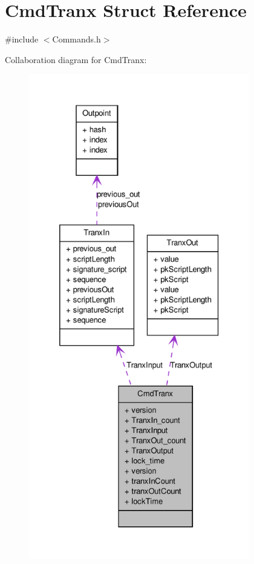 \hypertarget{struct_cmd_tranx}{
\section{CmdTranx Struct Reference}
\label{struct_cmd_tranx}
}


{\ttfamily \#include $<$Commands.h$>$}



Collaboration diagram for CmdTranx:\nopagebreak
\begin{figure}[H]
\begin{center}
\leavevmode
\includegraphics[height=600pt]{struct_cmd_tranx__coll__graph}
\end{center}
\end{figure}
